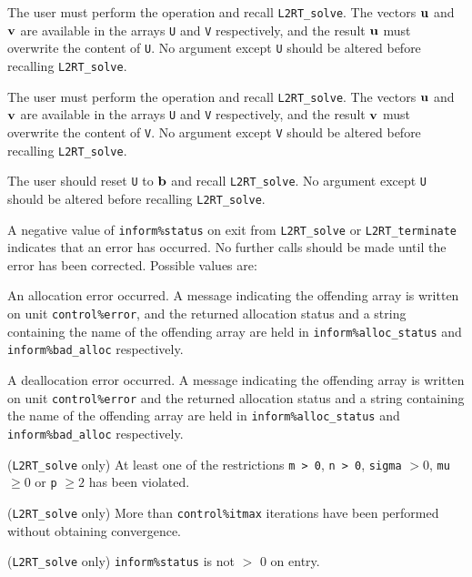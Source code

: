 \documentclass{galahad}
\newcommand{\packagename}{L2\-RT}
\begin{document}
\begin{description} 
 
 The user must perform the operation  
\disp{\bmu := \bmu + \bmA \bmv,}
and recall {\tt \packagename\_solve}. 
The vectors ${\mathbf{u}}$ and ${\mathbf{v}}$ are available in the arrays {\tt U}
and {\tt V} respectively, and the result  
${\mathbf{u}}$ must overwrite the content of {\tt U}. 
No argument except {\tt U} should be altered before recalling 
{\tt \packagename\_solve}. 
 
 The user must perform the operation  
and recall {\tt \packagename\_solve}. 
The vectors ${\mathbf{u}}$ and ${\mathbf{v}}$ are available in the arrays {\tt U}
and {\tt V} respectively, and the result  
${\mathbf{v}}$ must overwrite the content of {\tt V}. 
No argument except {\tt V} should be altered before recalling 
{\tt \packagename\_solve}. 
 
  The user should reset {\tt U} to ${\mathbf{b}}$ and recall 
{\tt \packagename\_solve}. 
No argument except {\tt U} should be altered before recalling 
{\tt \packagename\_solve}. 
\end{description} 


\galerrors
A negative value of  {\tt inform\%status} on exit from 
{\tt \packagename\_solve}
or 
{\tt \packagename\_terminate}
indicates that an error has occurred. No further calls should be made
until the error has been corrected. Possible values are:

\begin{description}
 An allocation error occurred. A message indicating 
the offending 
array is written on unit {\tt control\%error}, and the returned allocation 
status and a string containing the name of the offending array
are held in {\tt inform\%alloc\_\-status}
and {\tt inform\%bad\_alloc} respectively.

 A deallocation error occurred. 
A message indicating the offending 
array is written on unit {\tt control\%error} and the returned allocation 
status and a string containing the name of the offending array
are held in {\tt inform\%alloc\_\-status}
and {\tt inform\%bad\_alloc} respectively.

 ({\tt \packagename\_solve} only) 
At least one of the restrictions 
{\tt m > 0}, 
{\tt n > 0},
{\tt sigma} $> 0$,
{\tt mu} $\geq 0$
or
{\tt p} $\geq 2$
has been violated.

 ({\tt \packagename\_solve} only) More than  
{\tt control\%itmax} iterations have been performed without obtaining 
convergence. 
 
 ({\tt \packagename\_solve} only)  {\tt inform\%status} is
not $>$ 0 on entry.
 
\end{description} 
\end{document}
